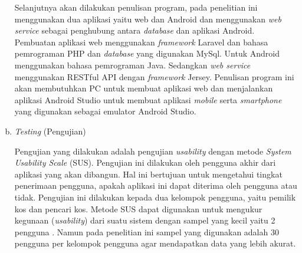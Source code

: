 \begin{enumerate}[a.]
Selanjutnya akan dilakukan penulisan program, pada penelitian ini menggunakan dua aplikasi yaitu web dan Android dan menggunakan \textit{web service} sebagai penghubung antara \textit{database }dan aplikasi Android. Pembuatan aplikasi web menggunakan \textit{framework} Laravel dan bahasa pemrograman PHP dan \textit{database} yang digunakan MySql. Untuk Android menggunakan bahasa pemrograman Java. Sedangkan \textit{web service} menggunakan RESTful API dengan \textit{framework} Jersey. Penulisan program ini akan membutuhkan PC untuk membuat aplikasi web dan menjalankan aplikasi Android Studio untuk membuat aplikasi \textit{mobile} serta \textit{smartphone} yang digunakan sebagai emulator Android Studio. 
	
	\item \textit{Testing} (Pengujian)
	
Pengujian yang dilakukan adalah pengujian \textit{usability} dengan metode \textit{System Usability Scale} (SUS). Pengujian ini dilakukan oleh pengguna akhir dari aplikasi yang akan dibangun. Hal ini bertujuan untuk mengetahui tingkat penerimaan pengguna, apakah aplikasi ini dapat diterima oleh pengguna atau tidak. Pengujian ini dilakukan kepada dua kelompok pengguna, yaitu pemilik kos dan pencari kos. Metode SUS dapat digunakan untuk mengukur kegunaan (\textit{usability}) dari suatu sistem dengan sampel yang kecil yaitu 2 pengguna \citep{brook1996}. Namun pada penelitian ini sampel yang digunakan adalah 30 pengguna per kelompok pengguna agar mendapatkan data yang lebih akurat.
\end{enumerate}

